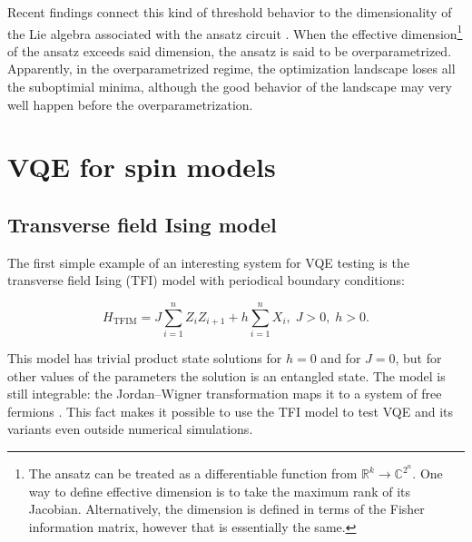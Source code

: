 Recent findings connect this kind of threshold behavior to the dimensionality of the Lie algebra associated with the ansatz circuit \cite{larocca_theory_2021}. When the effective dimension\footnote{The ansatz can be treated as a differentiable function from $\mathbb
{R}^k \rightarrow \mathbb{C}^{2^n}$. One way to define effective dimension is to take the maximum rank of its Jacobian. Alternatively, the dimension is defined in terms of the Fisher information matrix, however that is essentially the same.} of the ansatz exceeds said dimension, the ansatz is said to be overparametrized. Apparently, in the overparametrized regime, the optimization landscape loses all the suboptimial minima, although the good behavior of the landscape may very well happen before the overparametrization. 



\section{VQE for spin models}

\subsection{Transverse field Ising model}

The first simple example of an interesting system for VQE testing is the transverse field Ising (TFI) model with periodical boundary conditions:

\begin{equation}\label{eq:tfim}
    H_\mathrm{TFIM}=J\sum\limits_{i=1}^n Z_i Z_{i+1} + h\sum\limits_{i=1}^n X_i, \; J>0, \; h>0.
\end{equation}

This model has trivial product state solutions for $h = 0$ and for $J = 0$, but for other values of the parameters the solution is an entangled state. The model is still integrable: the Jordan--Wigner transformation maps it to a system of free fermions \cite{lieb_two_1961}. This fact makes it possible to use the TFI model to test VQE and its variants even outside numerical simulations. 

